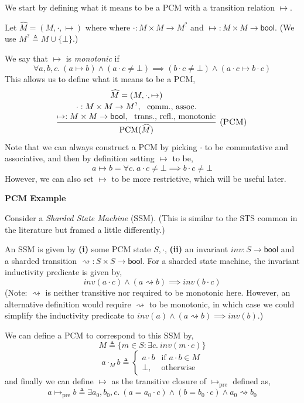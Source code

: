 \documentclass{article}
\newcommand{\einfer}[3]
        {\infer[(\textsc{#1})]{#3}{#2}}
\newcommand{\stacktwo}[2]{\stackanchor{\ensuremath{#1}}{\ensuremath{#2}}}
\newcommand{\stackthree}[3]{\stackanchor{\stacktwo{#1}{#2}}{\ensuremath{#3}}}
\newcommand{\bool}{\textsf{bool}}
\DeclareMathOperator{\PCM}{PCM}
\renewcommand{\eqdef}{\triangleq}
\begin{document}
We start by defining what it means to be a PCM with a transition relation $\mapsto$.

Let $\widehat{M} = (M, \cdot, \mapsto)$ where
where $\cdot : M \times M \to M^?$
and $\mapsto : M \times M \to \bool$.
(We use $M^? \eqdef M \cup \{\bot\}$.)

We say that $\mapsto$ is \emph{monotonic} if
\[ \forall a, b, c.~ (a \mapsto b) \land (a \cdot c \ne \bot) \implies (b \cdot c \ne \bot) \land (a \cdot c \mapsto b \cdot c) \]
This allows us to define what it means to be a PCM,
\[
  \einfer{PCM}{
    \stackthree{
      \widehat{M} = (M, \cdot, \mapsto)
    }{
      \cdot : M \times M \to M^?, \text{~~comm., assoc.}
    }{
      \mapsto : M \times M \to \bool, \text{~~trans., refl., monotonic}
    }
  }{
    \PCM(\widehat{M})
  }
\]
Note that we can always construct a PCM by picking $\cdot$ to be commutative and associative,
and then by definition setting $\mapsto$ to be,
\[
  a \mapsto b = \forall c .~ a \cdot c \ne \bot \implies b \cdot c \ne \bot
\]
However, we can also set $\mapsto$ to be more restrictive, which will be useful later.

\textbf{PCM Example}

Consider a \emph{Sharded State Machine} (SSM). (This is similar to the STS common in the literature but framed a little differently.)

An SSM is given by \textbf{(i)} some PCM state $S, \cdot$, \textbf{(ii)} an invariant $inv : S \to \bool$ and a sharded transition $\rightsquigarrow : S \times S \to \bool$. For a sharded state
machine, the invariant inductivity predicate is given by,
\[
  inv(a \cdot c) \land (a \rightsquigarrow b) \implies inv(b \cdot c)
\]
(Note: $\rightsquigarrow$ is neither transitive nor required to be monotonic here. However, an alternative definition would require $\rightsquigarrow$ to be monotonic, in which case we could
simplify the inductivity predicate to $inv(a) \land (a \rightsquigarrow b) \implies inv(b)$.)

We can define a PCM to correspond to this SSM by,
\[M \eqdef \{m \in S : \exists c .~ inv(m \cdot c) \}\]
\[a \cdot_M b \eqdef 
  \begin{cases}
      a \cdot b & \text{if } a \cdot b \in M\\
      \bot,              & \text{otherwise}
  \end{cases}\]
and finally we can define $\mapsto$ as the transitive closure of $\mapsto_\text{pre}$ defined as,
\[
a \mapsto_{\text{pre}} b \eqdef
  \exists a_0, b_0, c .~ (a = a_0 \cdot c) \land (b = b_0 \cdot c) \land a_0 \rightsquigarrow b_0
\]
\end{document}
